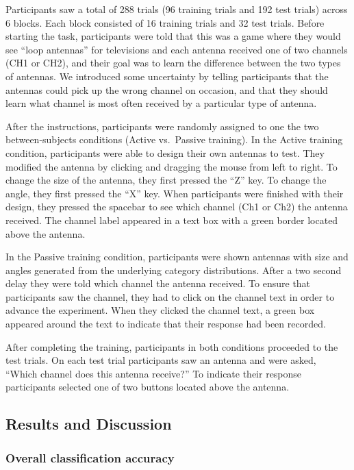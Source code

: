\documentclass[10pt, letterpaper]{article}
\begin{document}
Participants saw a total of 288 trials (96 training trials and 192 test
trials) across 6 blocks. Each block consisted of 16 training trials and
32 test trials. Before starting the task, participants were told that
this was a game where they would see ``loop antennas'' for televisions
and each antenna received one of two channels (CH1 or CH2), and their
goal was to learn the difference between the two types of antennas. We
introduced some uncertainty by telling participants that the antennas
could pick up the wrong channel on occasion, and that they should learn
what channel is most often received by a particular type of antenna.

After the instructions, participants were randomly assigned to one the
two between-subjects conditions (Active vs.~Passive training). In the
Active training condition, participants were able to design their own
antennas to test. They modified the antenna by clicking and dragging the
mouse from left to right. To change the size of the antenna, they first
pressed the ``Z'' key. To change the angle, they first pressed the ``X''
key. When participants were finished with their design, they pressed the
spacebar to see which channel (Ch1 or Ch2) the antenna received. The
channel label appeared in a text box with a green border located above
the antenna.

In the Passive training condition, participants were shown antennas with
size and angles generated from the underlying category distributions.
After a two second delay they were told which channel the antenna
received. To ensure that participants saw the channel, they had to click
on the channel text in order to advance the experiment. When they
clicked the channel text, a green box appeared around the text to
indicate that their response had been recorded.

After completing the training, participants in both conditions proceeded
to the test trials. On each test trial participants saw an antenna and
were asked, ``Which channel does this antenna receive?'' To indicate
their response participants selected one of two buttons located above
the antenna.

\subsection{Results and Discussion}\label{results-and-discussion}

\subsubsection{Overall classification
accuracy}\label{overall-classification-accuracy}
\end{document}
